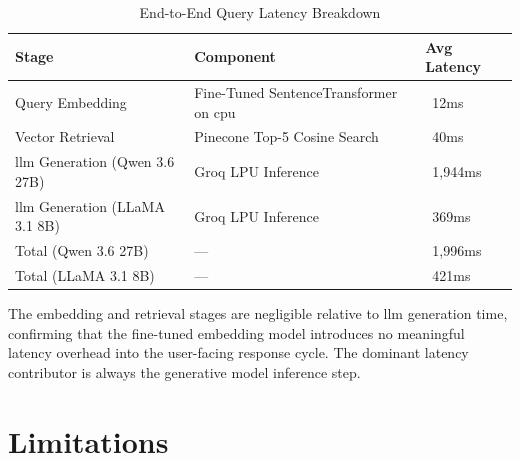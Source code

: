\begin{table}[H]

\centering

\caption{End-to-End Query Latency Breakdown}

\label{tab:latency}

\begin{tabular}{|p{4cm}|p{4cm}|p{4cm}|}

\hline

\textbf{Stage} & \textbf{Component} & \textbf{Avg Latency} \\

\hline

Query Embedding & Fine-Tuned SentenceTransformer on \gls{cpu} & ~12ms \\

\hline

Vector Retrieval & Pinecone Top-5 Cosine Search & ~40ms \\

\hline

\gls{llm} Generation (Qwen 3.6 27B) & Groq LPU Inference & ~1,944ms \\

\hline

\gls{llm} Generation (LLaMA 3.1 8B) & Groq LPU Inference & ~369ms \\

\hline

Total (Qwen 3.6 27B) & — & ~1,996ms \\

\hline

Total (LLaMA 3.1 8B) & — & ~421ms \\

\hline

\end{tabular}

\end{table}

The embedding and retrieval stages are negligible relative to \gls{llm} generation time, confirming that the fine-tuned embedding model introduces no meaningful latency overhead into the user-facing response cycle. The dominant latency contributor is always the generative model inference step.

\section{Limitations}


